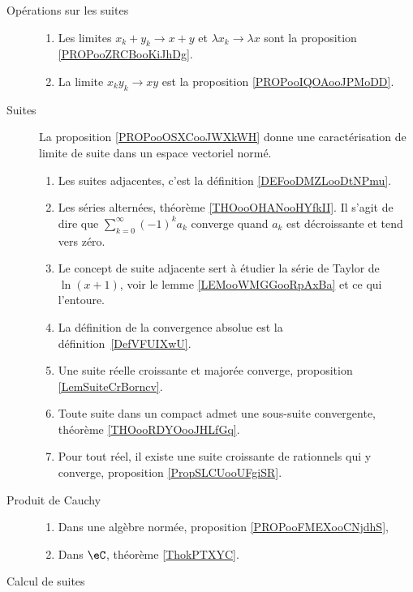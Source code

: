 
\begin{description}
	\item[Opérations sur les suites]
		\begin{enumerate}
			\item
			      Les limites \( x_k+y_k\to x+y\) et \( \lambda x_k\to \lambda x\) sont la proposition \ref{PROPooZRCBooKiJhDg}.
			\item
			      La limite \( x_ky_k\to xy\) est la proposition \ref{PROPooIQOAooJPMoDD}.
		\end{enumerate}
	\item[Suites]
		La proposition \ref{PROPooOSXCooJWXkWH} donne une caractérisation de limite de suite dans un espace vectoriel normé.
		\begin{enumerate}
			\item
			      Les suites adjacentes, c'est la définition \ref{DEFooDMZLooDtNPmu}.
			\item
			      Les séries alternées, théorème \ref{THOooOHANooHYfkII}. Il s'agit de dire que \( \sum_{k=0}^{\infty}(-1)^ka_k\) converge quand \( a_k\) est décroissante et tend vers zéro.
			\item
			      Le concept de suite adjacente sert à étudier la série de Taylor de \( \ln(x+1)\), voir le lemme \ref{LEMooWMGGooRpAxBa} et ce qui l'entoure.
			\item
			      La définition de la convergence absolue est la définition~\ref{DefVFUIXwU}.
			\item
			      Une suite réelle croissante et majorée converge, proposition \ref{LemSuiteCrBorncv}.
			\item
			      Toute suite dans un compact admet une sous-suite convergente, théorème \ref{THOooRDYOooJHLfGq}.
			\item
			      Pour tout réel, il existe une suite croissante de rationnels qui y converge, proposition \ref{PropSLCUooUFgiSR}.
		\end{enumerate}
	\item[Produit de Cauchy]
		\begin{enumerate}
			\item
			      Dans une algèbre normée, proposition \ref{PROPooFMEXooCNjdhS},
			\item
			      Dans \( \eC\), théorème \ref{ThokPTXYC}.
		\end{enumerate}
	\item[Calcul de suites]
		\begin{enumerate}

\end{enumerate}
\end{description}
